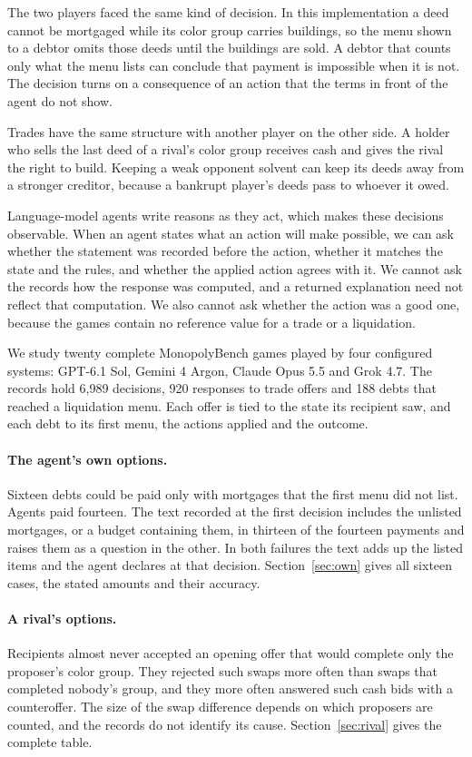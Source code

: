 \documentclass[11pt,letterpaper]{article}
\begin{document}
The two players faced the same kind of decision. In this implementation a deed cannot be mortgaged while its color group carries buildings, so the menu shown to a debtor omits those deeds until the buildings are sold. A debtor that counts only what the menu lists can conclude that payment is impossible when it is not. The decision turns on a consequence of an action that the terms in front of the agent do not show.

Trades have the same structure with another player on the other side. A holder who sells the last deed of a rival's color group receives cash and gives the rival the right to build. Keeping a weak opponent solvent can keep its deeds away from a stronger creditor, because a bankrupt player's deeds pass to whoever it owed.

Language-model agents write reasons as they act, which makes these decisions observable. When an agent states what an action will make possible, we can ask whether the statement was recorded before the action, whether it matches the state and the rules, and whether the applied action agrees with it. We cannot ask the records how the response was computed, and a returned explanation need not reflect that computation. We also cannot ask whether the action was a good one, because the games contain no reference value for a trade or a liquidation.

We study twenty complete MonopolyBench games played by four configured systems: GPT-6.1 Sol, Gemini 4 Argon, Claude Opus 5.5 and Grok 4.7. The records hold 6,989 decisions, 920 responses to trade offers and 188 debts that reached a liquidation menu. Each offer is tied to the state its recipient saw, and each debt to its first menu, the actions applied and the outcome.

\paragraph{The agent's own options.} Sixteen debts could be paid only with mortgages that the first menu did not list. Agents paid fourteen. The text recorded at the first decision includes the unlisted mortgages, or a budget containing them, in thirteen of the fourteen payments and raises them as a question in the other. In both failures the text adds up the listed items and the agent declares at that decision. Section~\ref{sec:own} gives all sixteen cases, the stated amounts and their accuracy.

\paragraph{A rival's options.} Recipients almost never accepted an opening offer that would complete only the proposer's color group. They rejected such swaps more often than swaps that completed nobody's group, and they more often answered such cash bids with a counteroffer. The size of the swap difference depends on which proposers are counted, and the records do not identify its cause. Section~\ref{sec:rival} gives the complete table.
\end{document}
